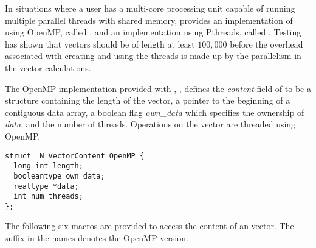 
In situations where a user has a multi-core processing unit capable of
running multiple parallel threads with shared memory, {\sundials} provides
an implementation of {\nvector} using OpenMP, called {\nvecopenmp}, and
an implementation using Pthreads, called {\nvecpthreads}.  
Testing has shown that vectors should be of length at least $100,000$ 
before the overhead associated with creating and using the threads is
made up by the parallelism in the vector calculations. 

The OpenMP {\nvector} implementation provided with {\sundials},
{\nvecopenmp}, defines the {\em content} field of  to be a structure 
containing the length of the vector, a pointer to the beginning of a contiguous 
data array, a boolean flag {\em own\_data} which specifies the ownership 
of {\em data}, and the number of threads.  
Operations on the vector are threaded using OpenMP.
\begin{verbatim} 
struct _N_VectorContent_OpenMP {
  long int length;
  booleantype own_data;
  realtype *data;
  int num_threads;
};
\end{verbatim}
The following six macros are provided to access the content of an {\nvecopenmp}
vector. The suffix  in the names denotes the OpenMP version.
